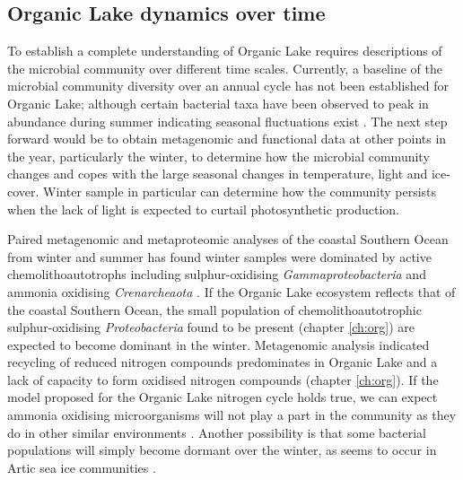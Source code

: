 \subsection{Organic Lake dynamics over time}
To establish a complete understanding of Organic Lake requires descriptions of the microbial community over different time scales.
Currently, a baseline of the microbial community diversity over an annual cycle has not been established for Organic Lake; although certain bacterial taxa have been observed to peak in abundance during summer indicating seasonal fluctuations exist \cite{James1994}.
The next step forward would be to obtain metagenomic and functional data at other points in the year, particularly the winter, to determine how the microbial community changes and copes with the large seasonal changes in temperature, light and ice-cover.
Winter sample in particular can determine how the community persists when the lack of light is expected to curtail photosynthetic production.


Paired metagenomic and metaproteomic analyses of the coastal Southern Ocean from winter and summer has found winter samples were dominated by active chemolithoautotrophs including sulphur-oxidising \emph{Gammaproteobacteria} and ammonia oxidising \emph{Crenarcheaota} \cite{Grzymski2012, Williams2012b}.
If the Organic Lake ecosystem reflects that of the coastal Southern Ocean, the small population of chemolithoautotrophic sulphur-oxidising \emph{Proteobacteria} found to be present (chapter \ref{ch:org}) are expected to become dominant in the winter.
Metagenomic analysis indicated recycling of reduced nitrogen compounds predominates in Organic Lake and a lack of capacity to form oxidised nitrogen compounds (chapter \ref{ch:org}).
If the model proposed for the Organic Lake nitrogen cycle holds true, we can expect ammonia oxidising microorganisms will not play a part in the community as they do in other similar environments \cite{Voytek1999, Grzymski2012, Williams2012b}.
Another possibility is that some bacterial populations will simply become dormant over the winter, as seems to occur in Artic sea ice communities \cite{Collins2010}.

